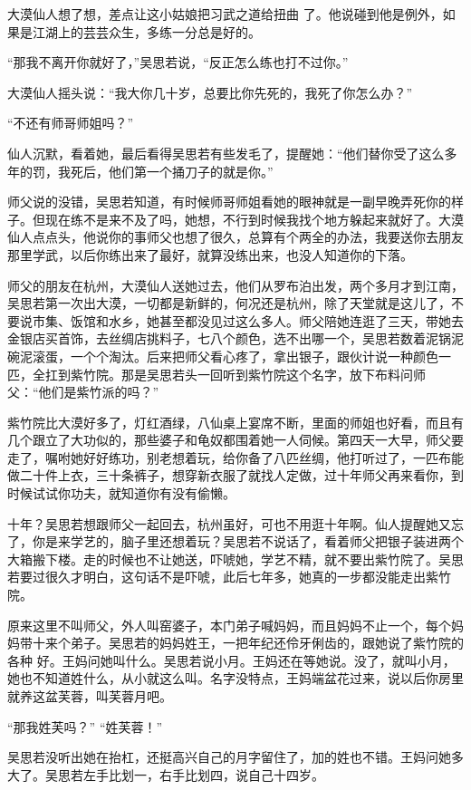 大漠仙人想了想，差点让这小姑娘把习武之道给扭曲
了。他说碰到他是例外，如果是江湖上的芸芸众生，多练一分总是好的。

“那我不离开你就好了，”吴思若说，“反正怎么练也打不过你。”

大漠仙人摇头说：“我大你几十岁，总要比你先死的，我死了你怎么办？”

“不还有师哥师姐吗？”

仙人沉默，看着她，最后看得吴思若有些发毛了，提醒她：“他们替你受了这么多年的罚，我死后，他们第一个捅刀子的就是你。”

师父说的没错，吴思若知道，有时候师哥师姐看她的眼神就是一副早晚弄死你的样子。但现在练不是来不及了吗，她想，不行到时候我找个地方躲起来就好了。大漠仙人点点头，他说你的事师父也想了很久，总算有个两全的办法，我要送你去朋友那里学武，以后你练出来了最好，就算没练出来，也没人知道你的下落。

师父的朋友在杭州，大漠仙人送她过去，他们从罗布泊出发，两个多月才到江南，吴思若第一次出大漠，一切都是新鲜的，何况还是杭州，除了天堂就是这儿了，不要说市集、饭馆和水乡，她甚至都没见过这么多人。师父陪她连逛了三天，带她去金银店买首饰，去丝绸店挑料子，七八个颜色，选不出哪一个，吴思若数着泥锅泥碗泥滚蛋，一个个淘汰。后来把师父看心疼了，拿出银子，跟伙计说一种颜色一匹，全扛到紫竹院。那是吴思若头一回听到紫竹院这个名字，放下布料问师父：“他们是紫竹派的吗？”

紫竹院比大漠好多了，灯红酒绿，八仙桌上宴席不断，里面的师姐也好看，而且有几个跟立了大功似的，那些婆子和龟奴都围着她一人伺候。第四天一大早，师父要走了，嘱咐她好好练功，别老想着玩，给你备了八匹丝绸，他打听过了，一匹布能做二十件上衣，三十条裤子，想穿新衣服了就找人定做，过十年师父再来看你，到时候试试你功夫，就知道你有没有偷懒。

十年？吴思若想跟师父一起回去，杭州虽好，可也不用逛十年啊。仙人提醒她又忘了，你是来学艺的，脑子里还想着玩？吴思若不说话了，看着师父把银子装进两个大箱搬下楼。走的时候也不让她送，吓唬她，学艺不精，就不要出紫竹院了。吴思若要过很久才明白，这句话不是吓唬，此后七年多，她真的一步都没能走出紫竹院。

原来这里不叫师父，外人叫窑婆子，本门弟子喊妈妈，而且妈妈不止一个，每个妈妈带十来个弟子。吴思若的妈妈姓王，一把年纪还伶牙俐齿的，跟她说了紫竹院的各种
好。王妈问她叫什么。吴思若说小月。王妈还在等她说。没了，就叫小月，她也不知道姓什么，从小就这么叫。名字没特点，王妈端盆花过来，说以后你房里就养这盆芙蓉，叫芙蓉月吧。

“那我姓芙吗？” “姓芙蓉！”

吴思若没听出她在抬杠，还挺高兴自己的月字留住了，加的姓也不错。王妈问她多大了。吴思若左手比划一，右手比划四，说自己十四岁。

